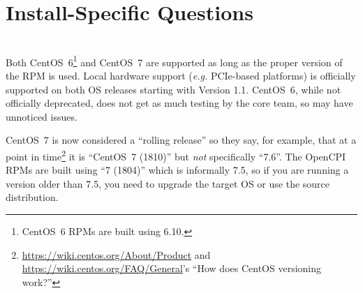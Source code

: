 \section{Install-Specific Questions}
\begin{description}[style=nextline]
\item[Does it matter what version of CentOS is used?]~\\
Both CentOS~6\footnote{CentOS~6 RPMs are built using 6.10.} and CentOS~7 are supported as long as the proper version of the RPM is used. Local hardware support (\textit{e.g.} PCIe-based platforms) is officially supported on both OS releases starting with Version 1.1.
CentOS~6, while not officially deprecated, does not get as much testing by the core team, so may have unnoticed issues.

CentOS~7 is now considered a ``rolling release'' so they say, for example, that at a point in
time\footnote{\url{https://wiki.centos.org/About/Product} and \url{https://wiki.centos.org/FAQ/General}'s ``How does CentOS versioning work?''} it is ``CentOS~7 (1810)'' but \textit{not} specifically ``7.6''.
The OpenCPI RPMs are built using ``7 (1804)'' which is informally 7.5, so if you are running a version older than 7.5, you need to upgrade the target OS or use the source distribution.
\end{description}

